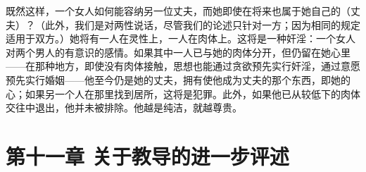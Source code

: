 既然这样，一个女人如何能容纳另一位丈夫，而她即使在将来也属于她自己的（丈夫）？（此外，我们是对两性说话，尽管我们的论述只针对一方；因为相同的规定适用于双方。）她将有一人在灵性上，一人在肉体上。这将是一种奸淫：一个女人对两个男人的有意识的感情。如果其中一人已与她的肉体分开，但仍留在她心里——在那种地方，即使没有肉体接触，思想也能通过贪欲预先实行奸淫，通过意愿预先实行婚姻——他至今仍是她的丈夫，拥有使他成为丈夫的那个东西，即她的心；如果另一个人在那里找到居所，这将是犯罪。此外，如果他已从较低下的肉体交往中退出，他并未被排除。他越是纯洁，就越尊贵。\par


\section{第十一章 关于教导的进一步评述}

